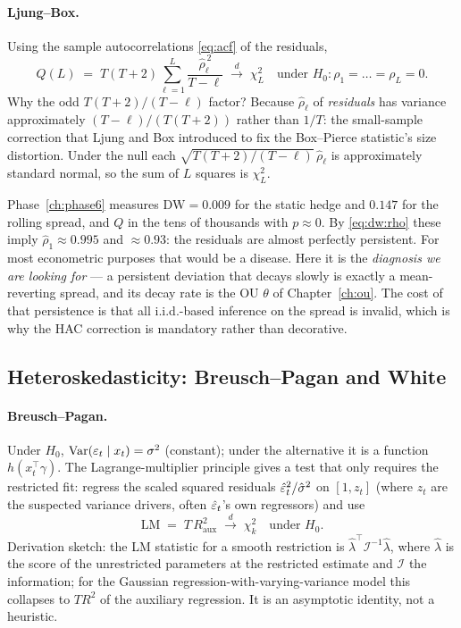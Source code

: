 \paragraph{Ljung--Box.} Using the sample autocorrelations \eqref{eq:acf} of the residuals,
\begin{equation}
  Q(L) \;=\; T(T+2)\sum_{\ell=1}^{L}\frac{\hat\rho_\ell^{\,2}}{T-\ell}
  \;\xrightarrow{\ d\ }\;\chi^2_{L}\quad\text{under }H_0:\rho_1=\dots=\rho_L=0 .
  \label{eq:ljungbox}
\end{equation}
Why the odd $T(T+2)/(T-\ell)$ factor? Because $\hat\rho_\ell$ of \emph{residuals} has
variance approximately $(T-\ell)/(T(T+2))$ rather than $1/T$: the small-sample correction
that Ljung and Box introduced to fix the Box--Pierce statistic's size distortion. Under
the null each $\sqrt{T(T+2)/(T-\ell)}\,\hat\rho_\ell$ is approximately standard normal,
so the sum of $L$ squares is $\chi^2_L$.

\begin{remark}
Phase~\ref{ch:phase6} measures $\mathrm{DW}=0.009$ for the static hedge and $0.147$ for
the rolling spread, and $Q$ in the tens of thousands with $p\approx0$. By
\eqref{eq:dw:rho} these imply $\hat\rho_1\approx0.995$ and $\approx0.93$: the residuals
are almost perfectly persistent. For most econometric purposes that would be a disease.
Here it is the \emph{diagnosis we are looking for} --- a persistent deviation that decays
slowly is exactly a mean-reverting spread, and its decay rate is the OU $\theta$ of
Chapter~\ref{ch:ou}. The cost of that persistence is that all i.i.d.-based inference on
the spread is invalid, which is why the HAC correction is mandatory rather than
decorative.
\end{remark}

\subsection{Heteroskedasticity: Breusch--Pagan and White}
\label{sec:ts:heterosk}

\paragraph{Breusch--Pagan.} Under $H_0$, $\operatorname{Var}(\varepsilon_t\mid x_t)=\sigma^2$ (constant);
under the alternative it is a function $h(x_t^{\top}\gamma)$. The Lagrange-multiplier
principle gives a test that only requires the restricted fit: regress the scaled squared
residuals $\hat{\varepsilon}_t^2/\hat\sigma^2$ on $[1, z_t]$ (where $z_t$ are the suspected
variance drivers, often $\hat{\varepsilon}_t$'s own regressors) and use
\begin{equation}
  \mathrm{LM} \;=\; T\,R^2_{\text{aux}} \;\xrightarrow{\ d\ }\; \chi^2_{k}
  \quad\text{under }H_0 .
  \label{eq:bp}
\end{equation}
Derivation sketch: the LM statistic for a smooth restriction is
$\hat\lambda^{\top}\mathcal I^{-1}\hat\lambda$, where $\hat\lambda$ is the score of the
unrestricted parameters at the restricted estimate and $\mathcal I$ the information; for
the Gaussian regression-with-varying-variance model this collapses to $TR^2$ of the
auxiliary regression. It is an asymptotic identity, not a heuristic.

